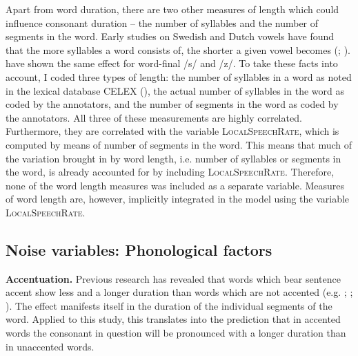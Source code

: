 Apart from word duration, there are two other measures of length which could influence consonant duration --  the number of syllables and the number of segments in the word.  Early studies on Swedish and Dutch vowels have found that the more syllables a word consists of, the shorter a given vowel becomes (\citealt{Lindblom.1963}; \citealt{Nooteboom.1972}). \citet{Plag.2017} have shown the same effect for word-final  /s/ and /z/. To take these facts into account, I coded three types of  length: the number of syllables in a word as noted in the lexical database CELEX (\citealt{Baayen.1995}), the actual number of syllables in the word as coded by the annotators, and the number of segments in the word as coded by the annotators. All three of these measurements are highly correlated. Furthermore, they are correlated with the variable \textsc{LocalSpeechRate}, which is computed by means of number of segments in the word. This means that much of the variation brought in by word length, i.e. number of syllables or segments in the word, is already accounted for by including \textsc{LocalSpeechRate}. Therefore, none of the word length measures was included as a separate variable. Measures of word length are, however, implicitly integrated in the model using the variable \textsc{LocalSpeechRate}.

\subsection{Noise variables: Phonological factors}

\textbf{Accentuation.} Previous research has revealed that words which bear sentence accent show less  and a longer duration than words which are not accented (e.g. \citealt{Sluijter.1996}; \citealt{Sugahara.2009}; \citealt{Bergmann.}). The  effect manifests itself in the duration of the individual segments of the word. Applied to this study, this translates into the prediction that in accented words the consonant in question will be pronounced with a longer duration than in unaccented words. 

